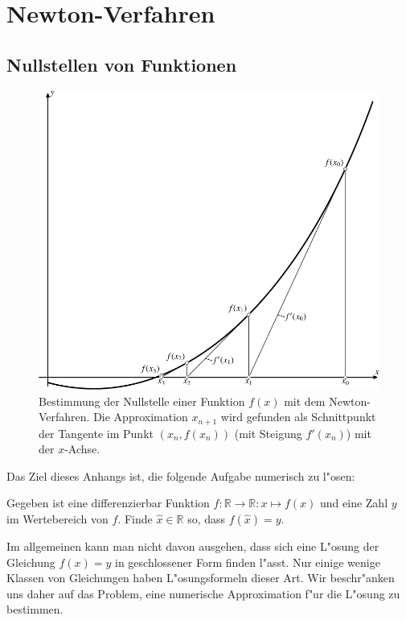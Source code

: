 \chapter{Newton-Verfahren\label{chapter:newton}}
\rhead{}

\section{Nullstellen von Funktionen}
\begin{figure}
\centering
\includegraphics{chapters/images/randwert-2.pdf}
\caption{Bestimmung der Nullstelle einer Funktion $f(x)$ mit dem
Newton-Verfahren.
Die Approximation $x_{n+1}$ wird gefunden als Schnittpunkt der Tangente
im Punkt $(x_n,f(x_n))$ (mit Steigung $f'(x_n)$) mit der $x$-Achse.
\label{newton:graphik}}
\end{figure}
Das Ziel dieses Anhangs ist, die folgende Aufgabe numerisch zu l"osen:
\begin{aufgabe}
Gegeben ist eine differenzierbar Funktion
$f\colon\mathbb R\to\mathbb R:x\mapsto f(x)$
und eine Zahl $y$ im Wertebereich von $f$.
Finde $\hat{x}\in\mathbb R$ so, dass $f(\hat{x})=y$.
\end{aufgabe}
Im allgemeinen kann man nicht davon ausgehen, dass sich eine L"osung der
Gleichung $f(x)=y$ in geschlossener Form finden l"asst.
Nur einige wenige Klassen von Gleichungen haben L"osungsformeln dieser Art.
Wir beschr"anken uns daher auf das Problem, eine numerische Approximation
f"ur die L"osung zu bestimmen.

